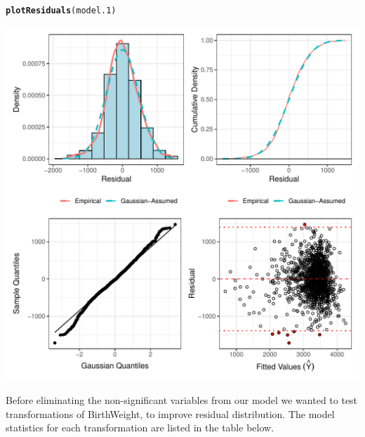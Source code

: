 \documentclass{article}\usepackage[]{graphicx}\usepackage[]{xcolor}
\makeatletter
\def\maxwidth{ %
  \ifdim\Gin@nat@width>\linewidth
    \linewidth
  \else
    \Gin@nat@width
  \fi
}
\newcommand{\hlstd}[1]{\textcolor[rgb]{0.345,0.345,0.345}{#1}}%
\newcommand{\hlkwd}[1]{\textcolor[rgb]{0.737,0.353,0.396}{\textbf{#1}}}%
\newenvironment{kframe}{%
 \def\at@end@of@kframe{}%
 \ifinner\ifhmode%
  \def\at@end@of@kframe{\end{minipage}}%
  \begin{minipage}{\columnwidth}%
 \fi\fi%
 \def\FrameCommand##1{\hskip\@totalleftmargin \hskip-\fboxsep
 \colorbox{shadecolor}{##1}\hskip-\fboxsep
     \hskip-\linewidth \hskip-\@totalleftmargin \hskip\columnwidth}%
 \MakeFramed {\advance\hsize-\width
   \@totalleftmargin\z@ \linewidth\hsize
   \@setminipage}}%
 {\par\unskip\endMakeFramed%
 \at@end@of@kframe}
\newenvironment{knitrout}{}{} %
\makeatother
\begin{document}
\begin{knitrout}
\color{fgcolor}\begin{kframe}
\begin{alltt}
\hlkwd{plotResiduals}\hlstd{(model.1)}
\end{alltt}
\end{kframe}
\includegraphics[width=\maxwidth]{figure/unnamed-chunk-10-1} 
\end{knitrout}

Before eliminating the non-significant variables from our model we wanted to test transformations of BirthWeight, to improve residual distribution. The model statistics for each transformation are listed in the table below. 
\end{document}
